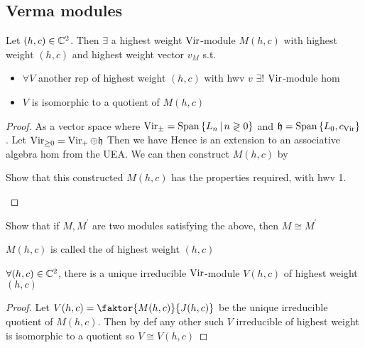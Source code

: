 \documentclass{article}
\begin{document}
\subsection{Verma modules}
\begin{prop}
Let $(h,c) \in \mathbb{C}^2$. Then $\exists$ a highest weight $\operatorname{Vir}$-module $M(h,c)$ with highest weight $(h,c)$ and highest weight vector $v_M$ s.t. 
\begin{itemize}
    \item $\forall V$ another rep of highest weight $(h,c)$ with hwv $v$ $\exists !$ $\operatorname{Vir}$-module hom 
    \item $V$ is isomorphic to a quotient of $M(h,c)$
\end{itemize}
\end{prop}
\begin{proof}
As a vector space 
where $\operatorname{Vir}_\pm = \operatorname{Span}\left\{ L_n \, | \, n \gtrless 0  \right\}$ and $\mathfrak{h} = \operatorname{Span}\left\{ L_0,c_{\operatorname{Vir}} \right\}$. Let $\operatorname{Vir}_{\geq 0} = \operatorname{Vir}_+ \oplus \mathfrak{h}$ Then we have 
Hence 
is an extension to an associative algebra hom from the UEA. We can then construct $M(h,c)$ by 

\begin{ex}
Show that this constructed $M(h,c)$ has the properties required, with hwv 1. 
\end{ex}

\end{proof}

\begin{ex}
Show that if $M,M^\prime$ are two modules satisfying the above, then $M \cong M^\prime$
\end{ex}
\begin{definition}
$M(h,c)$ is called the  of highest weight $(h,c)$
\end{definition}

\begin{corollary}
$\forall (h,c) \in \mathbb{C}^2$, there is a unique irreducible $\operatorname{Vir}$-module $V(h,c)$ of highest weight $(h,c)$
\end{corollary}
\begin{proof}
Let $V(h,c) = \faktor{M(h,c)}{J(h,c)}$ be the unique irreducible quotient of $M(h,c)$. Then by def any other such $V$ irreducible of highest weight is isomorphic to a quotient so $V \cong V(h,c)$
\end{proof}
\end{document}
